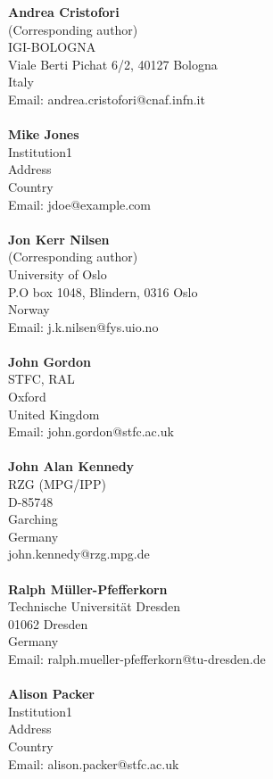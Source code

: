 \textbf{Andrea Cristofori} \\
(Corresponding author) \\
IGI-BOLOGNA \\
Viale Berti Pichat 6/2, 40127 Bologna \\
Italy \\
Email: andrea.cristofori@cnaf.infn.it \\
\\
\textbf{Mike Jones} \\
Institution1 \\
Address \\
Country \\
Email: jdoe@example.com \\
\\
\textbf{Jon Kerr Nilsen} \\
(Corresponding author) \\
University of Oslo \\
P.O box 1048, Blindern, 0316 Oslo \\
Norway \\
Email: j.k.nilsen@fys.uio.no \\
\\
\textbf{John Gordon} \\
STFC, RAL \\
Oxford \\
United Kingdom \\
Email: john.gordon@stfc.ac.uk \\
\\
\textbf{John Alan Kennedy} \\
RZG (MPG/IPP) \\
D-85748 \\
Garching \\
Germany \\
john.kennedy@rzg.mpg.de \\
\\
\textbf{Ralph M\"uller-Pfefferkorn} \\
Technische Universität Dresden \\
01062 Dresden \\
Germany \\
Email: ralph.mueller-pfefferkorn@tu-dresden.de \\
\\
\textbf{Alison Packer} \\
Institution1 \\
Address \\
Country \\
Email: alison.packer@stfc.ac.uk \\
\\
